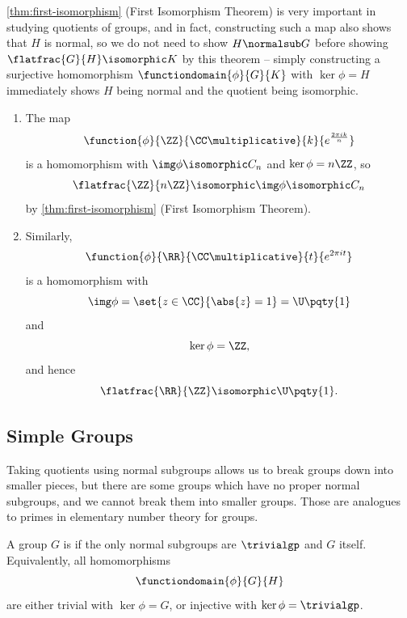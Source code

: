 \autoref{thm:first-isomorphism} (First Isomorphism Theorem) is very important in studying quotients of groups, and in fact, constructing such a map also shows that \(H\) is normal, so we do not need to show \(H \normalsub G\) before showing \(\flatfrac{G}{H} \isomorphic K\) by this theorem -- simply constructing a surjective homomorphism \(\functiondomain{\phi}{G}{K}\) with \(\ker \phi = H\) immediately shows \(H\) being normal and the quotient being isomorphic.

\begin{examples*}
    \begin{enumerate}
        \item The map
        \[
            \function{\phi}{\ZZ}{\CC\multiplicative}{k}{e^{\frac{2\pi i k}{n}}}
        \]
        is a homomorphism with \(\img \phi \isomorphic C_n\) and \(\ker \phi = n\ZZ\), so
        \[
            \flatfrac{\ZZ}{n\ZZ} \isomorphic \img \phi \isomorphic C_n
        \]
        by \autoref{thm:first-isomorphism} (First Isomorphism Theorem).

        \item Similarly,
        \[
            \function{\phi}{\RR}{\CC\multiplicative}{t}{e^{2 \pi i t}}
        \]
        is a homomorphism with
        \[
            \img \phi = \set{z \in \CC}{\abs{z} = 1} = \U\pqty{1}
        \]
        and
        \[
            \ker \phi = \ZZ,
        \]
        and hence
        \[
            \flatfrac{\RR}{\ZZ} \isomorphic \U\pqty{1}.
        \]
    \end{enumerate}
\end{examples*}

\subsection{Simple Groups}
\label{sec:simple-groups}

Taking quotients using normal subgroups allows us to break groups down into smaller pieces, but there are some groups which have no proper normal subgroups, and we cannot break them into smaller groups. Those are analogues to primes in elementary number theory for groups.

\begin{definition}
    A group \(G\) is  if the only normal subgroups are \(\trivialgp\) and \(G\) itself. Equivalently, all homomorphisms
    \[
        \functiondomain{\phi}{G}{H}
    \]
    are either trivial with \(\ker \phi = G\), or injective with \(\ker \phi = \trivialgp\).
\end{definition}

